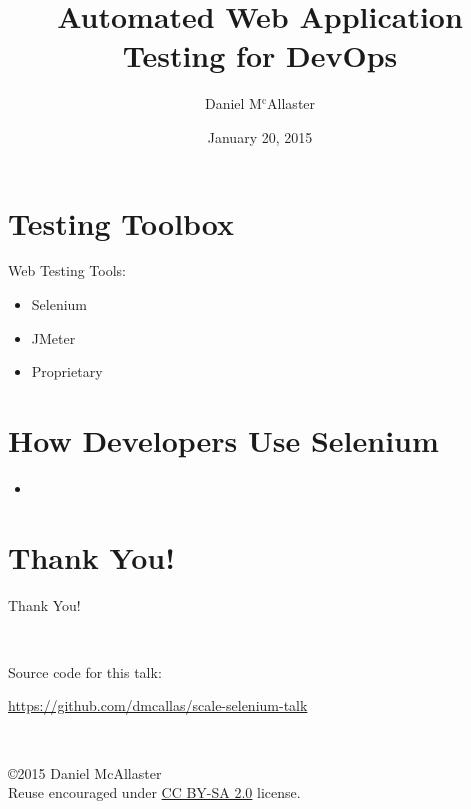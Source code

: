 \documentclass[14pt]{beamer}
\title[Automated Web Testing]{Automated Web Application Testing for DevOps}
\author{Daniel M$^\text{c}$Allaster}
\date{January 20, 2015}
\begin{document}
\frame{\titlepage}


\section[Toolbox]{Testing Toolbox}
\label{S:I}
\begin{frame}

Web Testing Tools:
\begin{itemize}[<+->]
\item Selenium
\item JMeter
\item Proprietary
\end{itemize}

\end{frame}

\section[Developers]{How Developers Use Selenium}

\begin{frame}
  \begin{itemize}[<+->]
  \item 
  \end{itemize}
\end{frame}

\section[]{Thank You!}
\begin{frame}
  \begin{center}
    \begin{Large}
      Thank You!
    \end{Large}\\
    \vspace{1cm}

    Source code for this talk:\\
    \begin{small}\url{https://github.com/dmcallas/scale-selenium-talk}\end{small}\\
    \vspace{1cm}
    \begin{small}
      \copyright2015 Daniel McAllaster\\
      Reuse encouraged under \href{https://creativecommons.org/licenses/by-sa/2.0/}{CC BY-SA 2.0} license.
    \end{small}
  \end{center}
\end{frame}
\end{document}
